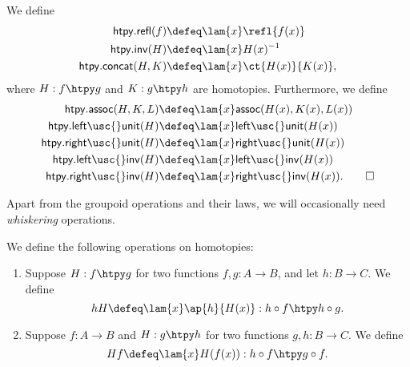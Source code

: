 \begin{constr}
We define
\begin{align*}
\mathsf{htpy.refl}(f) & \defeq \lam{x} \refl{f(x)} \\
\mathsf{htpy.inv}(H) & \defeq \lam{x} H(x)^{-1} \\
\mathsf{htpy.concat}(H,K) & \defeq \lam{x}\ct{H(x)}{K(x)},
\end{align*}
where $H:f\htpy g$ and $K:g\htpy h$ are homotopies. Furthermore, we define
\begin{align*}
\mathsf{htpy.assoc}(H,K,L) & \defeq \lam{x}\mathsf{assoc}(H(x),K(x),L(x)) \\
\mathsf{htpy.left\usc{}unit}(H) & \defeq \lam{x}\mathsf{left\usc{}unit}(H(x)) \\
\mathsf{htpy.right\usc{}unit}(H) & \defeq \lam{x}\mathsf{right\usc{}unit}(H(x)) \\
\mathsf{htpy.left\usc{}inv}(H) & \defeq \lam{x}\mathsf{left\usc{}inv}(H(x)) \\
\mathsf{htpy.right\usc{}inv}(H) & \defeq \lam{x}\mathsf{right\usc{}inv}(H(x)).\qedhere
\end{align*}
\end{constr}


Apart from the groupoid operations and their laws, we will occasionally need \emph{whiskering} operations.

\begin{defn}
We define the following  operations on homotopies:
\begin{enumerate}
\item Suppose $H:f\htpy g$ for two functions $f,g:A\to B$, and let $h:B\to C$. We define
\begin{equation*}
hH\defeq \lam{x}\ap{h}{H(x)}:h\circ f\htpy h\circ g.
\end{equation*}
\item Suppose $f:A\to B$ and $H:g\htpy h$ for two functions $g,h:B\to C$. We define
\begin{equation*}
Hf\defeq\lam{x}H(f(x)):h\circ f\htpy g\circ f.
\end{equation*}
\end{enumerate}
\end{defn}

